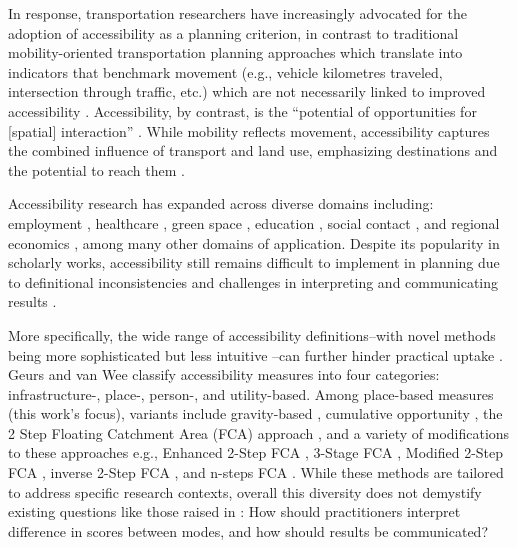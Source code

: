 \documentclass[
  10pt,
  letterpaper,
]{article}
\begin{document}
In response, transportation researchers have increasingly advocated for
the adoption of accessibility as a planning criterion, in contrast to
traditional mobility-oriented transportation planning approaches which
translate into indicators that benchmark movement (e.g., vehicle
kilometres traveled, intersection through traffic, etc.) which are not
necessarily linked to improved accessibility
\citep{silvaAccessibilityInstrumentsPlanning2017, paez_developing_2013, handy2020, elgeneidyMakingAccessibilityWork2022}.
Accessibility, by contrast, is the ``potential of opportunities for
{[}spatial{]} interaction'' \citep{hansen1959}. While mobility reflects
movement, accessibility captures the combined influence of transport and
land use, emphasizing destinations and the potential to reach them
\citep{handyMeasuringAccessibilityExploration1997}.

Accessibility research has expanded across diverse domains including:
employment
\citep{karstEvaluationAccessibilityImpacts2003, grengs2010job, paez_jobs_2013, merlin2017competition, tao_investigating_2020},
healthcare
\citep{luo2003, paez_healthcare_2010, wan2012three, delamater2013spatial, boisjoly2017informality, pereira_2021_geographic},
green space
\citep{reyesAccessibility2014, rojas_accessibility_2016, liang_novel_2024},
education
\citep{williams_disparities_2014, romanillosAccessibilitySchoolsSpatial2018, marques_accessibility_2021},
social contact
\citep{neutens_human_2007, farberActivitySpacesMeasurement2012, farber_2013_social},
and regional economics
\citep{vickermanAccessibility1999, lopezMeasuring2008, ribeiro_road_2010, gutierrez_evaluating_2011},
among many other domains of application. Despite its popularity in
scholarly works, accessibility still remains difficult to implement in
planning due to definitional inconsistencies
\citep{vanweeAccessible2016, handy2020, kapatsila_resolving_2023} and
challenges in interpreting and communicating results
\citep{geursAccessibilityEvaluationLanduse2004, vanweeAccessible2016, ferreiraReenactingMobilityAccessibility2020}.

More specifically, the wide range of accessibility definitions--with
novel methods being more sophisticated but less intuitive
\citep{kapatsila_resolving_2023}--can further hinder practical uptake
\citep{vanweeAccessible2016}. Geurs and van Wee
\citep{geursAccessibilityEvaluationLanduse2004} classify accessibility
measures into four categories: infrastructure-, place-, person-, and
utility-based. Among place-based measures (this work's focus), variants
include gravity-based \citep{hansen1959}, cumulative opportunity
\citep{pirie_measuring_1979}, the 2 Step Floating Catchment Area (FCA)
approach \citep{luo2003}, and a variety of modifications to these
approaches e.g., Enhanced 2-Step FCA \citep{luoEnhanced2009}, 3-Stage
FCA \citep{wan2012three}, Modified 2-Step FCA
\citep{delamater2013spatial}, inverse 2-Step FCA
\citep{wang_2sfca_2021}, and n-steps FCA \citep{liang_novel_2024}. While
these methods are tailored to address specific research contexts,
overall this diversity does not demystify existing questions like those
raised in \citet{vanweeAccessible2016}: How should practitioners
interpret difference in scores between modes, and how should results be
communicated?
\end{document}
